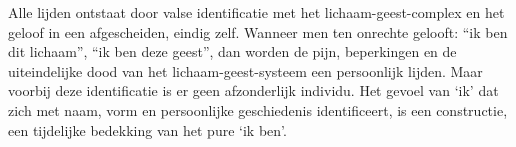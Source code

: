 Alle lijden ontstaat door valse identificatie met het lichaam-geest-complex en het geloof in een afgescheiden, eindig zelf. Wanneer men ten onrechte gelooft: “ik ben dit lichaam”, “ik ben deze geest”, dan worden de pijn, beperkingen en de uiteindelijke dood van het lichaam-geest-systeem een persoonlijk lijden. Maar voorbij deze identificatie is er geen afzonderlijk individu. Het gevoel van ‘ik’ dat zich met naam, vorm en persoonlijke geschiedenis identificeert, is een constructie, een tijdelijke bedekking van het pure ‘ik ben’.
